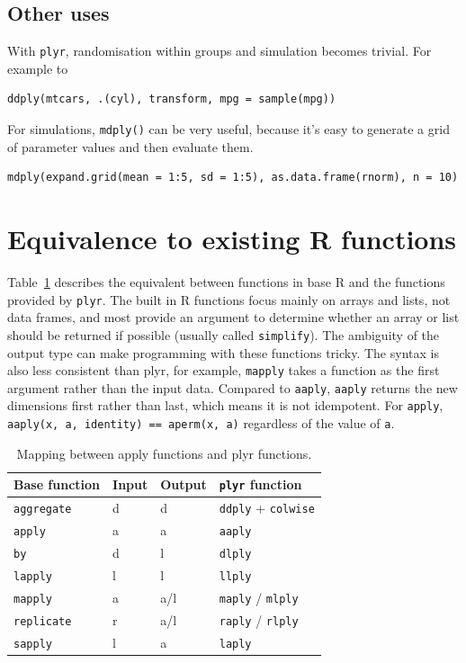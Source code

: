 \documentclass{scrartcl}
\newcommand{\code}[1]{\lstinline!#1!}
\newcommand{\f}[1]{\lstinline!#1()!}
\newcommand{\plyr}{{\tt plyr}\xspace}
\begin{document}
\subsection{Other uses}

With \plyr, randomisation within groups and simulation becomes trivial.  For example to 

\begin{verbatim}
ddply(mtcars, .(cyl), transform, mpg = sample(mpg))  
\end{verbatim}

For simulations, \f{mdply} can be very useful, because it's easy to generate a grid of parameter values and then evaluate them.

\begin{verbatim}
mdply(expand.grid(mean = 1:5, sd = 1:5), as.data.frame(rnorm), n = 10)
\end{verbatim}

\section{Equivalence to existing R functions}
\label{sec:equiv}

Table~\ref{tbl:equiv} describes the equivalent between functions in base R and 
the functions provided by {\tt plyr}.  The built in R functions focus mainly on arrays and lists, not data frames, and most provide an argument to determine whether an array or list should be returned if possible (usually called \code{simplify}).  The ambiguity of the output type can make programming with these functions tricky. The syntax is also less consistent than plyr, for example, {\tt mapply} takes a function as the first argument rather than the input data.  Compared to {\tt aaply}, {\tt aaply} returns the new dimensions first rather than last, which means it is not idempotent.  For \code{apply}, {\tt aaply(x, a, identity) == aperm(x, a)} regardless of the value of {\tt a}. 

\begin{table}[htpb]
  \begin{center}
  \begin{tabular}{llll}
    \toprule
    Base function & Input & Output & \plyr function \\
    \midrule
    \code{aggregate} & d & d   & \code{ddply} + \code{colwise} \\
    \code{apply }    & a & a   & \code{aaply} \\
    \code{by}        & d & l   & \code{dlply} \\
    \code{lapply}    & l & l   & \code{llply} \\
    \code{mapply}    & a & a/l & \code{maply} / \code{mlply} \\
    \code{replicate} & r & a/l & \code{raply} / \code{rlply} \\
    \code{sapply}    & l & a   & \code{laply} \\
    \bottomrule
  \end{tabular}
  \end{center}
  \caption{Mapping between apply functions and plyr functions.}
  \label{tbl:equiv}
\end{table}
\end{document}
